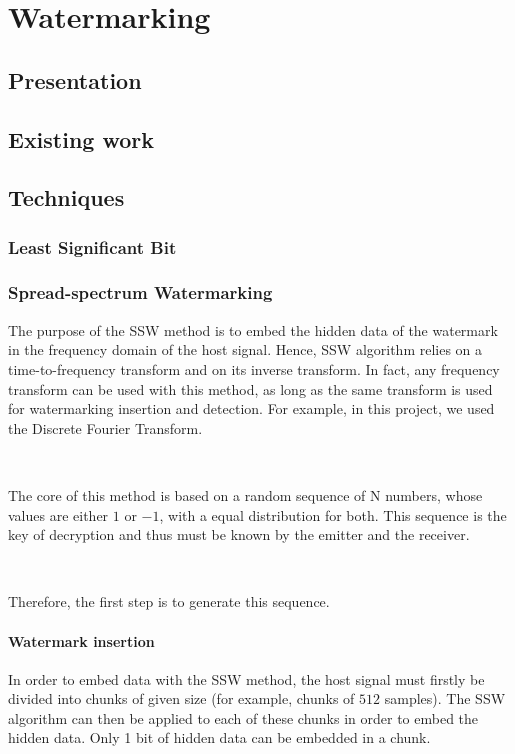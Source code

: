 \chapter{Watermarking}
\section{Presentation}
\section{Existing work}
\section{Techniques}
\subsection{Least Significant Bit}
\subsection{Spread-spectrum Watermarking}

The purpose of the \ac{SSW} method is to embed the hidden data of the watermark in the frequency domain of the host signal. Hence, \ac{SSW} algorithm relies on a time-to-frequency transform and on its inverse transform. In fact, any frequency transform can be used with this method, as long as the same transform is used for watermarking insertion and detection. For example, in this project, we used the Discrete Fourier Transform.

~

The core of this method is based on a random sequence of N numbers, whose values are either $1$ or $-1$, with a equal distribution for both. This sequence is the key of decryption and thus must be known by the emitter and the receiver.

~

Therefore, the first step is to generate this sequence.

\subsubsection{Watermark insertion}

In order to embed data with the \ac{SSW} method, the host signal must firstly be divided into chunks of given size (for example, chunks of $512$ samples). The \ac{SSW} algorithm can then be applied to each of these chunks in order to embed the hidden data. Only 1 bit of hidden data can be embedded in a chunk.

